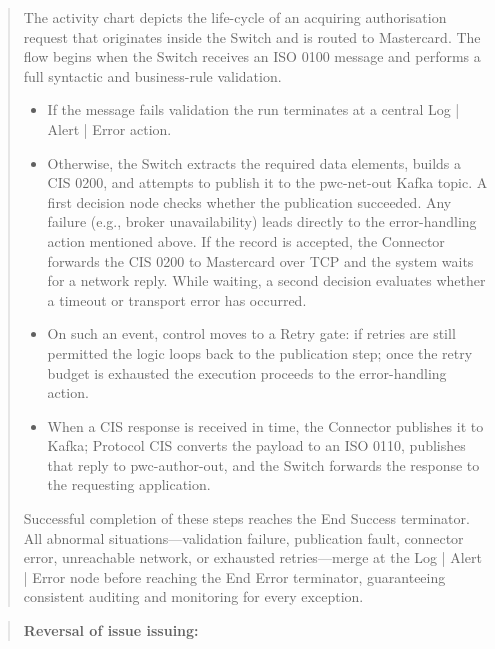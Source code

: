 \documentclass[12pt,a4paper]{report}
\begin{document}
\begin{quote}
The activity chart depicts the life-cycle of an acquiring authorisation request that originates inside the Switch and is routed to Mastercard.
The flow begins when the Switch receives an ISO 0100 message and performs a full syntactic and business-rule validation.
\begin{itemize}
\item If the message fails validation the run terminates at a central Log | Alert | Error action.
\item Otherwise, the Switch extracts the required data elements, builds a CIS 0200, and attempts to publish it to the pwc-net-out Kafka topic.
A first decision node checks whether the publication succeeded. Any failure (e.g., broker unavailability) leads directly to the error-handling action mentioned above. If the record is accepted, the Connector forwards the CIS 0200 to Mastercard over TCP and the system waits for a network reply.
While waiting, a second decision evaluates whether a timeout or transport error has occurred.
\item On such an event, control moves to a Retry gate: if retries are still permitted the logic loops back to the publication step; once the retry budget is exhausted the execution proceeds to the error-handling action.
\item When a CIS response is received in time, the Connector publishes it to Kafka; Protocol CIS converts the payload to an ISO 0110, publishes that reply to pwc-author-out, and the Switch forwards the response to the requesting application.
\end{itemize}
Successful completion of these steps reaches the End Success terminator. All abnormal situations—validation failure, publication fault, connector error, unreachable network, or exhausted retries—merge at the Log | Alert | Error node before reaching the End Error terminator, guaranteeing consistent auditing and monitoring for every exception.

\end{quote}
\clearpage

\begin{quote}
\textbf{Reversal of issue issuing:}
\end{quote}
\end{document}
